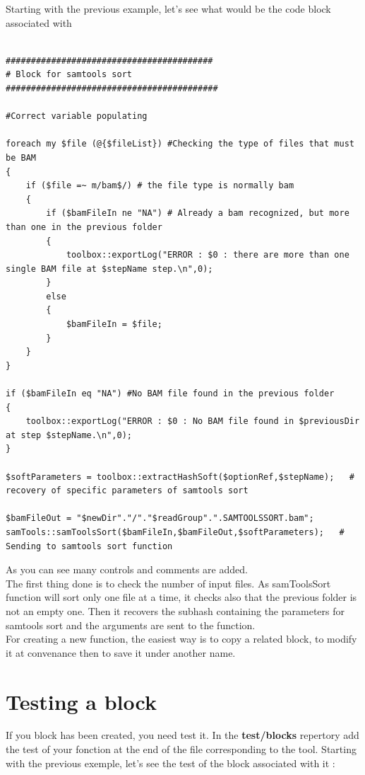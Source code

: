\documentclass[a4paper,10pt]{report}
\begin{document}
Starting with the previous example, let's see what would be the code block associated with

\begin{lstlisting}

#########################################
# Block for samtools sort
##########################################

#Correct variable populating

foreach my $file (@{$fileList}) #Checking the type of files that must be BAM
{
    if ($file =~ m/bam$/) # the file type is normally bam
    {
        if ($bamFileIn ne "NA") # Already a bam recognized, but more than one in the previous folder
        {
            toolbox::exportLog("ERROR : $0 : there are more than one single BAM file at $stepName step.\n",0);
        }
        else
        {
            $bamFileIn = $file;
        }
    }
}

if ($bamFileIn eq "NA") #No BAM file found in the previous folder
{
    toolbox::exportLog("ERROR : $0 : No BAM file found in $previousDir at step $stepName.\n",0);
}

$softParameters = toolbox::extractHashSoft($optionRef,$stepName);   # recovery of specific parameters of samtools sort

$bamFileOut = "$newDir"."/"."$readGroup".".SAMTOOLSSORT.bam";
samTools::samToolsSort($bamFileIn,$bamFileOut,$softParameters);   # Sending to samtools sort function
\end{lstlisting}

As you can see many controls and comments are added.\\

The first thing done is to check the number of input files. As samToolsSort function will sort only one file at a time, it checks also that the previous folder is not an empty one. Then it recovers the subhash containing the parameters for samtools sort and the arguments are sent to the function.\\

For creating a new function, the easiest way is to copy a related block, to modify it at convenance then to save it under another name.


\section{Testing a block}

If you block has been created, you need test it. In the \textbf{test/blocks} repertory add the test of your fonction at the end of the file corresponding to the tool. Starting with the previous exemple, let's see the test of the block associated with it : \\
\end{document}
